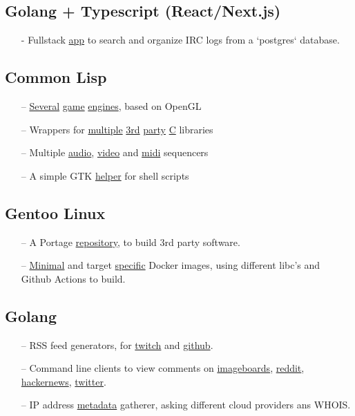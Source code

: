 \documentclass[11pt]{article}
\newcommand{\git}[2]{\href {https://github.com/azimut/#2} {#1}}
\begin{document}
\subsection{Golang + Typescript (React/Next.js)}
\begin{itemize}
  \setlength{\parskip}{0pt}
  \setlength{\itemsep}{0pt plus 1pt}
\item[-] Fullstack {\git{app}{rounded}} to search and organize IRC logs from a `postgres` database.
\end{itemize}

\subsection{Common Lisp}
\begin{itemize}
  \setlength{\parskip}{0pt}
  \setlength{\itemsep}{0pt plus 1pt}
  \item[--] \git{Several}{shiny} \git{game}{incandescent} \git{engines}{scenic}, based on OpenGL
  \item[--] Wrappers for \git{multiple}{cl-gme} \git{3rd}{espeak-ng} \git{party}{aubio} \git{C}{cloud} libraries
  \item[--] Multiple \git{audio}{meniere}, \git{video}{viseq} and \git{midi}{launchpad-csound} sequencers
  \item[--] A simple GTK \git{helper}{ipickme} for shell scripts
\end{itemize}

\subsection{Gentoo Linux}
\begin{itemize}
  \setlength{\parskip}{0pt}
  \setlength{\itemsep}{0pt plus 1pt}
  \item[--] A Portage \git{repository}{overlay}, to build 3rd party software.
  \item[--] \git{Minimal}{kubler-dock} and target \git{specific}{gantoo} Docker images, using different libc's and Github Actions to build.
\end{itemize}

\subsection{Golang}
\begin{itemize}
  \setlength{\parskip}{0pt}
  \setlength{\itemsep}{0pt plus 1pt}
  \item[--] RSS feed generators, for \git{twitch}{twitch-rss} and \git{github}{github-rss}.
  \item[--] Command line clients to view comments on
    \git{imageboards}{lainviewer},
    \git{reddit}{redditviewer},
    \git{hackernews}{cli-view},
    \git{twitter}{cli-view}.
  \item[--] IP address \git{metadata}{sunny} gatherer, asking different cloud providers ans WHOIS.
\end{itemize}
\end{document}
